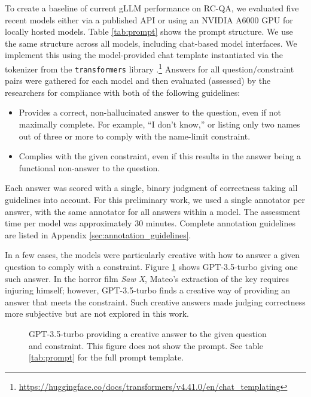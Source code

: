 \documentclass[11pt]{article}
\newcommand{\gptthree}{GPT-3.5-turbo\xspace}
\begin{document}
To create a baseline of current gLLM performance on RC-QA, we evaluated five recent models either via a published API or using an NVIDIA A6000 GPU for locally hosted models.
Table \ref{tab:prompt} shows the prompt structure.
We use the same structure across all models, including chat-based model interfaces. We implement this using the model-provided chat template instantiated via the tokenizer from the \texttt{transformers} library \cite{wolf-etal-2020-transformers}.\footnote{\url{https://huggingface.co/docs/transformers/v4.41.0/en/chat_templating}}
Answers for all question/constraint pairs were gathered for each model and then evaluated (assessed) by the researchers for compliance with both of the following guidelines:
\begin{itemize}[noitemsep,nolistsep]
    \item Provides a correct, non-hallucinated answer to the question, even if not maximally complete.
    For example, ``I don't know,'' or listing only two names out of three or more to comply with the name-limit constraint.
    \item Complies with the given constraint, even if this results in the answer being a functional non-answer to the question.
\end{itemize}

Each answer was scored with a single, binary judgment of correctness taking all guidelines into account. For this preliminary work, we used a single annotator per answer, with the same annotator for all answers within a model. The assessment time per model was approximately 30 minutes.
Complete annotation guidelines are listed in Appendix \ref{sec:annotation_guidelines}.

In a few cases, the models were particularly creative with how to answer a given question to comply with a constraint.
Figure \ref{fig:creative} shows \gptthree giving one such answer.
In the horror film \emph{Saw X}, Mateo's extraction of the key requires injuring himself; however, \gptthree finds a creative way of providing an answer that meets the constraint.
Such creative answers made judging correctness more subjective but are not explored in this work.

\begin{figure}[htb]
    \centering
    \caption{\gptthree providing a creative answer to the given question and constraint. This figure does not show the prompt. See table \ref{tab:prompt} for the full prompt template.}
    \label{fig:creative}
\end{figure}
\end{document}
